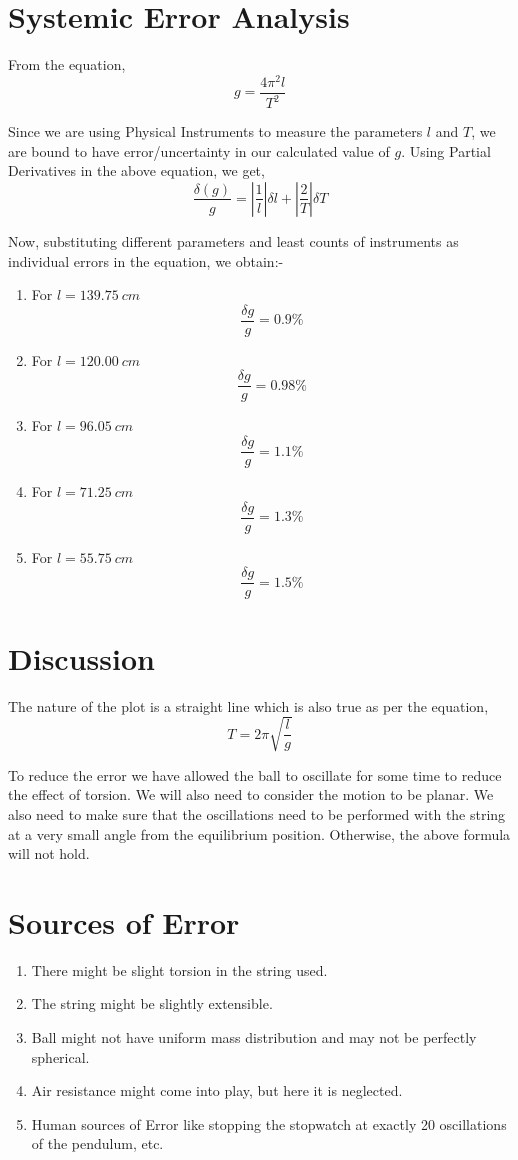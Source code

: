 \documentclass[12pt]{article}
\begin{document}
	\section{Systemic Error Analysis}
	
	From the equation, $$g = \frac{4\pi^{2}l}{T^{2}}$$
	
	Since we are using Physical Instruments to measure the parameters $l$ and $T$, we are bound to have error/uncertainty in our calculated value of $g$. Using Partial Derivatives in the above equation, we get, $$\frac{\delta(g)}{g} = \left|\frac{1}{l}\right|\delta l + \left|\frac{2}{T}\right|\delta T$$
	
	\pagebreak
	
	Now, substituting different parameters and least counts of instruments as individual errors in the equation, we obtain:-
	
	\begin{enumerate}
		\item For $l = 139.75\ cm$ $$\frac{\delta g}{g} = 0.9\%$$
		\item For $l = 120.00\ cm$ $$\frac{\delta g}{g} = 0.98\%$$
		\item For $l = 96.05\ cm$ $$\frac{\delta g}{g} = 1.1\%$$
		\item For $l = 71.25\ cm$ $$\frac{\delta g}{g} = 1.3\%$$
		\item For $l = 55.75\ cm$ $$\frac{\delta g}{g} = 1.5\%$$
	\end{enumerate}

	\section{Discussion}
	
	The nature of the plot is a straight line which is also true as per the equation, $$T = 2\pi \sqrt{\frac{l}{g}}$$
	
	To reduce the error we have allowed the ball to oscillate for some time to reduce the effect of torsion. We will also need to consider the motion to be planar. We also need to make sure that the oscillations need to be performed with the string at a very small angle from the equilibrium position. Otherwise, the above formula will not hold. 
	
	\section{Sources of Error}
	
	\begin{enumerate}[label=\alph*]
		\item There might be slight torsion in the string used.
		\item The string might be slightly extensible.
		\item Ball might not have uniform mass distribution and may not be perfectly spherical.
		\item Air resistance might come into play, but here it is neglected.
		\item Human sources of Error like stopping the stopwatch at exactly 20 oscillations of the pendulum, etc.
	\end{enumerate}
	
\end{document}
